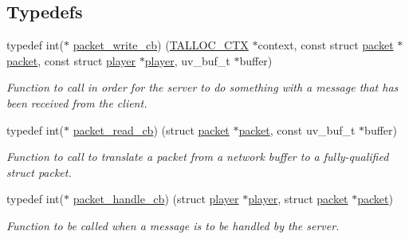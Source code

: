 \subsection*{Typedefs}
\begin{DoxyCompactItemize}
\item 
typedef int($\ast$ \hyperlink{group__packet_ga10aa1174318b280e6772d66ef7ff010e}{packet\+\_\+write\+\_\+cb}) (\hyperlink{group__talloc_ga8a521b1347c0e37b84eb942db8fa9beb}{T\+A\+L\+L\+O\+C\+\_\+\+C\+T\+X} $\ast$context, const struct \hyperlink{structpacket}{packet} $\ast$\hyperlink{structpacket}{packet}, const struct \hyperlink{structplayer}{player} $\ast$\hyperlink{structplayer}{player}, uv\+\_\+buf\+\_\+t $\ast$buffer)
\begin{DoxyCompactList}\small\item\em Function to call in order for the server to do something with a message that has been received from the client. \end{DoxyCompactList}\item 
typedef int($\ast$ \hyperlink{group__packet_ga60dc8d100ec60f5abb142f1f2253e6b2}{packet\+\_\+read\+\_\+cb}) (struct \hyperlink{structpacket}{packet} $\ast$\hyperlink{structpacket}{packet}, const uv\+\_\+buf\+\_\+t $\ast$buffer)
\begin{DoxyCompactList}\small\item\em Function to call to translate a packet from a network buffer to a fully-\/qualified {\ttfamily struct packet}. \end{DoxyCompactList}\item 
typedef int($\ast$ \hyperlink{group__packet_ga9d343d646c5c1e052d61561702a4bf3e}{packet\+\_\+handle\+\_\+cb}) (struct \hyperlink{structplayer}{player} $\ast$\hyperlink{structplayer}{player}, struct \hyperlink{structpacket}{packet} $\ast$\hyperlink{structpacket}{packet})
\begin{DoxyCompactList}\small\item\em Function to be called when a message is to be handled by the server. \end{DoxyCompactList}\end{DoxyCompactItemize}
